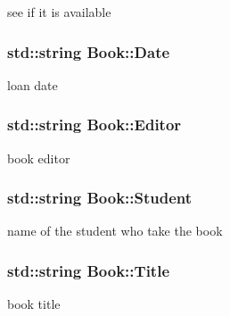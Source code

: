 see if it is available 

\subsubsection[{\texorpdfstring{Date}{Date}}]{\setlength{\rightskip}{0pt plus 5cm}std\+::string Book\+::\+Date\hspace{0.3cm}{\ttfamily [private]}}\hypertarget{classBook_a45a1a5f93a5ec021cc605b0c905d1d6f}{}\label{classBook_a45a1a5f93a5ec021cc605b0c905d1d6f}


loan date 

\subsubsection[{\texorpdfstring{Editor}{Editor}}]{\setlength{\rightskip}{0pt plus 5cm}std\+::string Book\+::\+Editor\hspace{0.3cm}{\ttfamily [private]}}\hypertarget{classBook_a18602b69a54cf1533569ac857681b03f}{}\label{classBook_a18602b69a54cf1533569ac857681b03f}


book editor 

\subsubsection[{\texorpdfstring{Student}{Student}}]{\setlength{\rightskip}{0pt plus 5cm}std\+::string Book\+::\+Student\hspace{0.3cm}{\ttfamily [private]}}\hypertarget{classBook_ae89daf9343a917dced86da884961ed3a}{}\label{classBook_ae89daf9343a917dced86da884961ed3a}


name of the student who take the book 

\subsubsection[{\texorpdfstring{Title}{Title}}]{\setlength{\rightskip}{0pt plus 5cm}std\+::string Book\+::\+Title\hspace{0.3cm}{\ttfamily [private]}}\hypertarget{classBook_a862b94a2fd16ac90209afa4393d8df8a}{}\label{classBook_a862b94a2fd16ac90209afa4393d8df8a}


book title 

